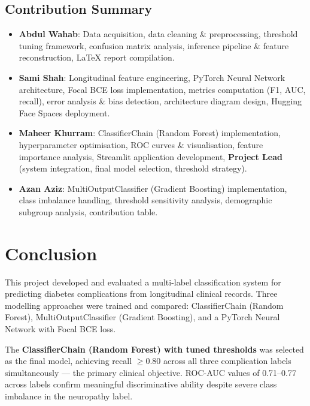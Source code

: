 \documentclass[12pt]{article}
\begin{document}
\subsection*{Contribution Summary}

\begin{itemize}
    \item \textbf{Abdul Wahab}: Data acquisition, data cleaning \& preprocessing,
          threshold tuning framework, confusion matrix analysis, inference pipeline
          \& feature reconstruction, LaTeX report compilation.

    \item \textbf{Sami Shah}: Longitudinal feature engineering, PyTorch Neural Network
          architecture, Focal BCE loss implementation, metrics computation (F1, AUC, recall),
          error analysis \& bias detection, architecture diagram design,
          Hugging Face Spaces deployment.

    \item \textbf{Maheer Khurram}: ClassifierChain (Random Forest) implementation,
          hyperparameter optimisation, ROC curves \& visualisation, feature importance
          analysis, Streamlit application development,
          \textbf{Project Lead} (system integration, final model selection, threshold strategy).

    \item \textbf{Azan Aziz}: MultiOutputClassifier (Gradient Boosting) implementation,
          class imbalance handling, threshold sensitivity analysis, demographic subgroup
          analysis, contribution table.
\end{itemize}


\section{Conclusion}

This project developed and evaluated a multi-label classification system for predicting
diabetes complications from longitudinal clinical records. Three modelling approaches
were trained and compared: ClassifierChain (Random Forest), MultiOutputClassifier
(Gradient Boosting), and a PyTorch Neural Network with Focal BCE loss.

The \textbf{ClassifierChain (Random Forest) with tuned thresholds} was selected as the
final model, achieving recall $\geq 0.80$ across all three complication labels
simultaneously --- the primary clinical objective. ROC-AUC values of 0.71--0.77 across
labels confirm meaningful discriminative ability despite severe class imbalance in the
neuropathy label.
\end{document}
